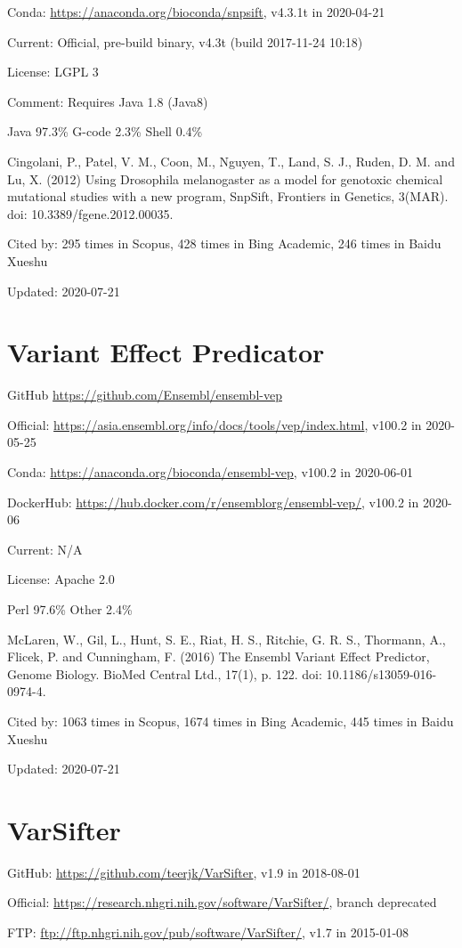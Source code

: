 \documentclass[]{article}
\newcommand{\cb}[3]{\par Cited by: {\color{blue}\Huge #1} times in Scopus, {\color{blue}\Huge #2} times in Bing Academic, {\color{blue}\Huge #3} times in Baidu Xueshu}
\begin{document}
Conda: \url{https://anaconda.org/bioconda/snpsift}, v4.3.1t in 2020-04-21

Current: Official, pre-build binary, v4.3t (build 2017-11-24 10:18)

License: LGPL 3

Comment: Requires Java 1.8 (Java8)

Java 97.3\% G-code 2.3\% Shell 0.4\%

Cingolani, P., Patel, V. M., Coon, M., Nguyen, T., Land, S. J., Ruden, D. M. and Lu, X. (2012) Using Drosophila melanogaster as a model for genotoxic chemical mutational studies with a new program, SnpSift, Frontiers in Genetics, 3(MAR). doi: 10.3389/fgene.2012.00035.\cb{295}{428}{246}

Updated: 2020-07-21

\section{Variant Effect Predicator}

GitHub \url{https://github.com/Ensembl/ensembl-vep}

Official: \url{https://asia.ensembl.org/info/docs/tools/vep/index.html}, v100.2 in 2020-05-25

Conda: \url{https://anaconda.org/bioconda/ensembl-vep}, v100.2 in 2020-06-01

DockerHub: \url{https://hub.docker.com/r/ensemblorg/ensembl-vep/}, v100.2 in 2020-06

Current: N/A

License: Apache 2.0

Perl 97.6\% Other 2.4\%

McLaren, W., Gil, L., Hunt, S. E., Riat, H. S., Ritchie, G. R. S., Thormann, A., Flicek, P. and Cunningham, F. (2016) The Ensembl Variant Effect Predictor, Genome Biology. BioMed Central Ltd., 17(1), p. 122. doi: 10.1186/s13059-016-0974-4.\cb{1063}{1674}{445}

Updated: 2020-07-21

\section{VarSifter}

GitHub: \url{https://github.com/teerjk/VarSifter}, v1.9 in 2018-08-01

Official: \url{https://research.nhgri.nih.gov/software/VarSifter/}, branch deprecated

FTP: \url{ftp://ftp.nhgri.nih.gov/pub/software/VarSifter/}, v1.7 in 2015-01-08
\end{document}
